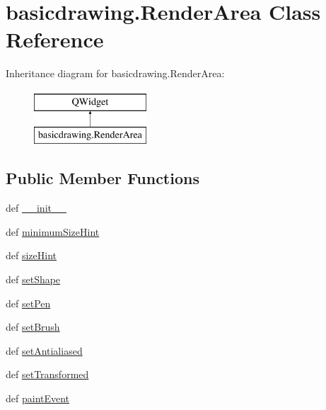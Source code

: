 \hypertarget{classbasicdrawing_1_1RenderArea}{}\section{basicdrawing.\+Render\+Area Class Reference}
\label{classbasicdrawing_1_1RenderArea}
Inheritance diagram for basicdrawing.\+Render\+Area\+:\begin{figure}[H]
\begin{center}
\leavevmode
\includegraphics[height=2.000000cm]{classbasicdrawing_1_1RenderArea}
\end{center}
\end{figure}
\subsection*{Public Member Functions}
\begin{DoxyCompactItemize}
\item 
def \hyperlink{classbasicdrawing_1_1RenderArea_aed26549a99adefc5f374d6d08b7621e6}{\+\_\+\+\_\+init\+\_\+\+\_\+}
\item 
def \hyperlink{classbasicdrawing_1_1RenderArea_aada375ec5b1059d1b6d9c519bd5a17f8}{minimum\+Size\+Hint}
\item 
def \hyperlink{classbasicdrawing_1_1RenderArea_a959e6b7b2874313f8b425d8fbed6138a}{size\+Hint}
\item 
def \hyperlink{classbasicdrawing_1_1RenderArea_adace03923953f442b2871fa764495a98}{set\+Shape}
\item 
def \hyperlink{classbasicdrawing_1_1RenderArea_af0e964fa58f14156f17b71cbc8242fe8}{set\+Pen}
\item 
def \hyperlink{classbasicdrawing_1_1RenderArea_a6f7e8f582628579ce93b0da0a3a13262}{set\+Brush}
\item 
def \hyperlink{classbasicdrawing_1_1RenderArea_ac721100a278c1a9a1016fc54dd3d4072}{set\+Antialiased}
\item 
def \hyperlink{classbasicdrawing_1_1RenderArea_aa8dfd8106f68ef14efcb7694a0a1c26e}{set\+Transformed}
\item 
def \hyperlink{classbasicdrawing_1_1RenderArea_a58289c7682af790261ef5a11a32822c7}{paint\+Event}
\end{DoxyCompactItemize}

